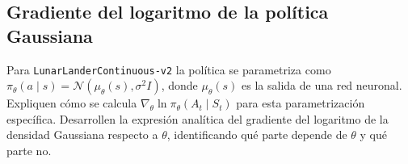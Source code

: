 \documentclass[11pt,letterpaper]{article}
\begin{document}
\subsection{Gradiente del logaritmo de la política Gaussiana}

\begin{enunciado}
Para \texttt{LunarLanderContinuous-v2} la política se parametriza como
$\pi_\theta(a \mid s) = \mathcal{N}(\mu_\theta(s), \sigma^2 I)$, donde $\mu_\theta(s)$ es
la salida de una red neuronal. Expliquen cómo se calcula
$\nabla_\theta \ln \pi_\theta(A_t \mid S_t)$ para esta parametrización específica.
Desarrollen la expresión analítica del gradiente del logaritmo de la densidad Gaussiana
respecto a $\theta$, identificando qué parte depende de $\theta$ y qué parte no.
\end{enunciado}
\end{document}
